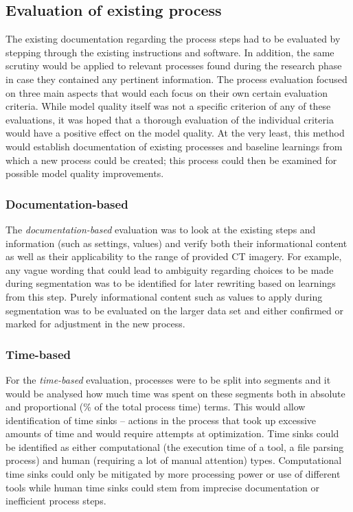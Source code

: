 \documentclass[MME,Projekt,english]{twbook}%
\begin{document}
\subsection{Evaluation of existing process}

The existing documentation regarding the process steps had to be evaluated by stepping through the existing instructions and software. In addition, the same scrutiny would be applied to relevant processes found during the research phase in case they contained any pertinent information. The process evaluation focused on three main aspects that would each focus on their own certain evaluation criteria. While model quality itself was not a specific criterion of any of these evaluations, it was hoped that a thorough evaluation of the individual criteria would have a positive effect on the model quality. At the very least, this method would establish documentation of existing processes and baseline learnings from which a new process could be created; this process could then be examined for possible model quality improvements.

\subsubsection{Documentation-based}

The \emph{documentation-based} evaluation was to look at the existing steps and information (such as settings, values) and verify both their informational content as well as their applicability to the range of provided CT imagery. For example, any vague wording that could lead to ambiguity regarding choices to be made during segmentation was to be identified for later rewriting based on learnings from this step. Purely informational content such as values to apply during segmentation was to be evaluated on the larger data set and either confirmed or marked for adjustment in the new process.

\subsubsection{Time-based}

For the \emph{time-based} evaluation, processes were to be split into segments and it would be analysed how much time was spent on these segments both in absolute and proportional (\% of the total process time) terms. This would allow identification of time sinks – actions in the process that took up excessive amounts of time and would require attempts at optimization. Time sinks could be identified as either computational (the execution time of a tool, a file parsing process) and human (requiring a lot of manual attention) types. Computational time sinks could only be mitigated by more processing power or use of different tools while human time sinks could stem from imprecise documentation or inefficient process steps.
\end{document}
